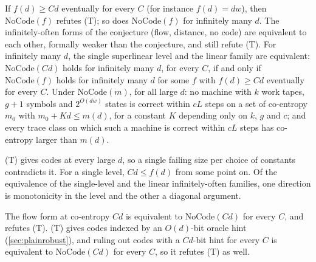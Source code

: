 \begin{theorem}\label{thm:io}
If $f(d)\ge Cd$ eventually for every $C$ (for instance $f(d)=dw$), then $\mathrm{NoCode}(f)$ refutes
(T); so does $\mathrm{NoCode}(f)$ for infinitely many $d$. The infinitely-often forms of the conjecture
(flow, distance, no code) are equivalent to each other, formally weaker than the conjecture, and still
refute (T). For infinitely many $d$, the single superlinear level and the linear family are equivalent:
$\mathrm{NoCode}(Cd)$ holds for infinitely many $d$, for every $C$, if and only if $\mathrm{NoCode}(f)$
holds for infinitely many $d$ for some $f$ with $f(d)\ge Cd$ eventually for every $C$. Under
$\mathrm{NoCode}(m)$, for all large $d$: no machine with $k$ work tapes, $g+1$ symbols and $2^{O(dw)}$
states is correct within $cL$ steps on a set of co-entropy $m_0$ with $m_0+Kd\le m(d)$, for a constant $K$
depending only on $k$, $g$ and $c$; and every trace class on which such a machine is correct within $cL$
steps has co-entropy larger than $m(d)$.
\end{theorem}

\begin{outline}
(T) gives codes at every large $d$, so a single failing size per choice of constants contradicts it.
For a single level, $Cd\le f(d)$ from some point on. Of the equivalence of the single-level and the
linear infinitely-often families, one direction is monotonicity in the level and the other a diagonal
argument.
\end{outline}

\begin{theorem}\label{thm:rungs}
The flow form at co-entropy $Cd$ is equivalent to $\mathrm{NoCode}(Cd)$ for every $C$, and refutes (T).
(T) gives codes indexed by an $O(d)$-bit oracle hint (\cref{sec:plainrobust}), and ruling out codes with
a $Cd$-bit hint for every $C$ is equivalent to $\mathrm{NoCode}(Cd)$ for every $C$, so it refutes (T)
as well.
\end{theorem}

